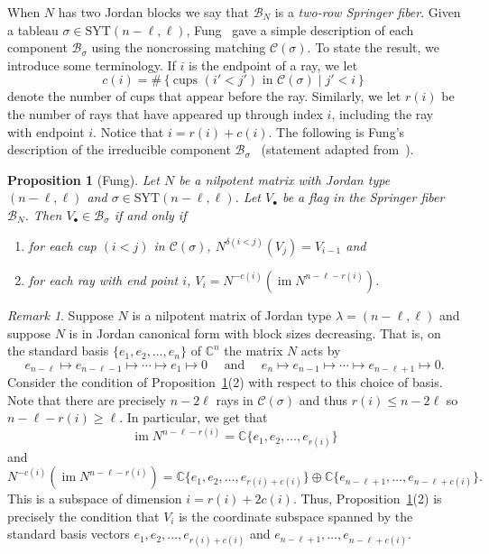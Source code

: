 \documentclass[11pt]{amsart}
\newtheorem{prop}[theorem]{Proposition}
\theoremstyle{remark}
\newtheorem{remark}[theorem]{Remark}
\theoremstyle{remark}
\theoremstyle{definition}
\theoremstyle{definition}
\theoremstyle{definition}
\numberwithin{equation}{section}
\newcommand{\C}{\mathbb{C}}           %
\newcommand{\im}{\operatorname{im }}
\newcommand{\gs}{\sigma}
\newcommand{\cc}{\mathcal{C}}
\newcommand{\SYT}{\mathrm{SYT}}
\newcommand{\SF}{\mathcal{B}}
\newcommand{\cupsigma}{\cc(\gs)}
\begin{document}
 


When $N$ has two Jordan blocks we say that $\SF_N$ is a \emph{two-row Springer fiber}. Given a tableau $\gs\in \SYT(n-\ell, \ell)$, Fung~\cite[Theorem 5.2]{Fung2003} gave a simple description of each component $\SF_\gs$ using the noncrossing matching $\cupsigma$. To state the result, we introduce some terminology. If $i$ is the endpoint of a ray, we let 
\[
c(i) = \#\left\{ \text{cups } (i'<j') \text{ in }\cupsigma\mid j'<i \right\}
\]
denote the number of cups that appear before the ray. Similarly, we let $r(i)$ be the number of rays that have appeared up through index $i$, including the ray with endpoint $i$. Notice that $i=r(i)+c(i)$.  The following is Fung's description of the irreducible component $\SF_\gs$~\cite{Fung2003} (statement adapted from~\cite[Proposition 7]{StroppelWebster2012}).  


\begin{prop}[Fung]\label{prop.Fung} Let $N$ be a nilpotent matrix with Jordan type $(n-\ell, \ell)$ and $\gs\in \SYT(n-\ell, \ell)$.  Let $V_\bullet$ be a flag in the Springer fiber $\SF_N$. Then $V_\bullet\in \SF_\gs$ if and only if    
\begin{enumerate}
\item[\textup{(1)}] for each cup $(i<j)$ in $\cc(\sigma)$,  $N^{\delta(i<j)}\left(V_{j}\right)=V_{i-1}$ and
\item[\textup{(2)}] for each ray with end point $i$, $V_i=N^{-c(i)}\left(\im N^{n-\ell-r(i)}\right)$. 
\end{enumerate}
\end{prop}

\begin{remark}\label{rem.ray-condition} Suppose $N$ is a nilpotent matrix of Jordan type $\lambda = (n-\ell, \ell)$ and suppose $N$ is in Jordan canonical form with block sizes decreasing. That is, on the standard basis $\{e_1, e_2, \ldots, e_n\}$ of $\C^n$ the matrix $N$ acts by
\[
e_{n-\ell} \mapsto e_{n-\ell-1}\mapsto \cdots \mapsto e_1\mapsto 0 \quad \text{ and } \quad e_n \mapsto e_{n-1}\mapsto \cdots \mapsto e_{n-\ell+1} \mapsto 0.
\]
Consider the condition of Proposition~\ref{prop.Fung}(2) with respect to this choice of basis. Note that there are precisely $n-2\ell$ rays in $\cupsigma$ and thus $r(i)\leq n-2\ell$ so $n-\ell-r(i) \geq \ell$. In particular, we get that 
\[
\im N^{n-\ell-r(i)} = \C\{e_1, e_2,\ldots, e_{r(i)}\}
\]
and 
\[
N^{-c(i)}\left(\im N^{n-\ell-r(i)}\right) = \C\{e_1, e_2, \ldots, e_{r(i)+c(i)}\} \oplus\C\{ e_{n-\ell+1}, \ldots, e_{n-\ell +c(i)}\}.
\]
This is a subspace of dimension $i = r(i)+2c(i)$. Thus, Proposition~\ref{prop.Fung}(2) is precisely the condition that $V_i$ is the coordinate subspace spanned by the standard basis vectors $e_1, e_2, \ldots, e_{r(i)+c(i)}$ and $e_{n-\ell +1}, \ldots, e_{n-\ell + c(i)}$. 
\end{remark}
\end{document}
